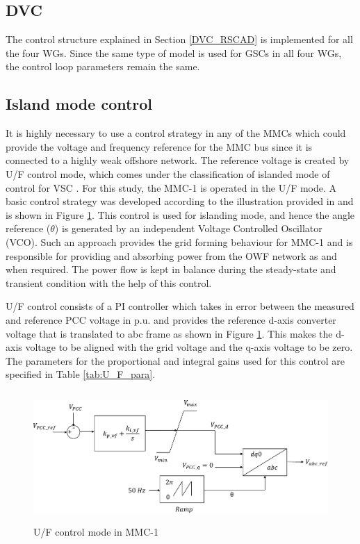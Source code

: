 \subsection{DVC}
The control structure explained in Section \ref{DVC_RSCAD} is implemented for all the four \gls{WG}s. Since the same type of model is used for \gls{GSC}s in all four \gls{WG}s, the control loop parameters remain the same.

\subsection{Island mode control}
It is highly necessary to use a control strategy in any of the \gls{MMC}s which could provide the voltage and frequency reference for the \gls{MMC} bus since it is connected to a highly weak offshore network. The reference voltage is created by U/F control mode, which comes under the classification of islanded mode of control for \gls{VSC} \cite{vrana2013cigre}. For this study, the \gls{MMC}-1 is operated in the U/F mode. A basic control strategy was developed according to the illustration provided in \cite{wachal2014guide} and is shown in Figure \ref{fig:U_F_control}. This control is used for islanding mode, and hence the angle reference ($\theta$) is generated by an independent Voltage Controlled Oscillator (VCO). Such an approach provides the grid forming behaviour for \gls{MMC}-1 and is responsible for providing and absorbing power from the \gls{OWF} network as and when required. The power flow is kept in balance during the steady-state and transient condition with the help of this control.  

U/F control consists of a \gls{PI} controller which takes in error between the measured and reference \gls{PCC} voltage in p.u. and provides the reference d-axis converter voltage that is translated to abc frame as shown in Figure \ref{fig:U_F_control}. This makes the d-axis voltage to be aligned with the grid voltage and the q-axis voltage to be zero. The parameters for the proportional and integral gains used for this control are specified in Table \ref{tab:U_F_para}. 

\begin{figure}[H]
\centering
    \includegraphics[height = 5cm,width = 12.5cm]{Diagrams/Chapter_4/U_F_control.pdf}
    \caption{U/F control mode in MMC-1 \cite{vrana2013cigre}}
    \label{fig:U_F_control}
\end{figure}


